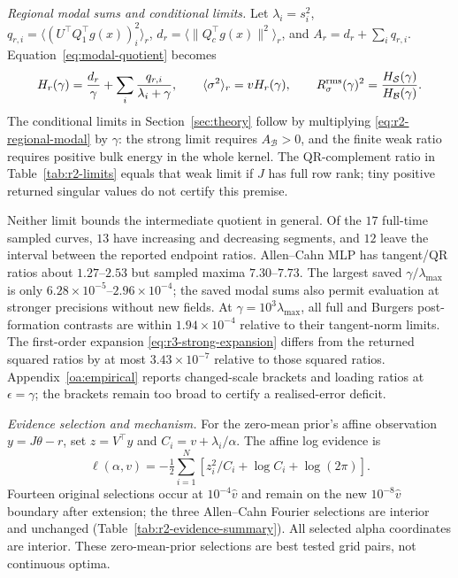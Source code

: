 \emph{Regional modal sums and conditional limits.}\label{app:r2:modal}
Let $\lambda_i=s_i^2$,
$q_{r,i}=\langle(U^\top Q_1^\top g(x))_i^2\rangle_r$,
$d_r=\langle\|Q_c^\top g(x)\|^2\rangle_r$, and
$A_r=d_r+\sum_iq_{r,i}$. Equation~\eqref{eq:modal-quotient} becomes
\begin{equation}\label{eq:r2-regional-modal}
 H_r(\gamma)=\frac{d_r}{\gamma}+\sum_i\frac{q_{r,i}}{\lambda_i+\gamma},\qquad
 \langle\sigma^2\rangle_r=vH_r(\gamma),\qquad
 R_{\sigma}^{\mathrm{rms}}(\gamma)^2=\frac{H_{\mathcal S}(\gamma)}{H_{\mathcal B}(\gamma)}.
\end{equation}
The conditional limits in Section~\ref{sec:theory} follow by multiplying \eqref{eq:r2-regional-modal}
by $\gamma$: the strong limit requires $A_{\mathcal B}>0$, and the finite weak
ratio requires positive bulk energy in the whole kernel. The QR-complement ratio
in Table~\ref{tab:r2-limits} equals that weak limit if $J$ has full row rank;
tiny positive returned singular values do not certify this premise.



Neither limit bounds the intermediate quotient in general. Of the $17$ full-time
sampled curves, $13$ have increasing and decreasing segments, and $12$ leave the
interval between the reported endpoint ratios. Allen--Cahn MLP has tangent/QR ratios
about $1.27$--$2.53$ but sampled maxima $7.30$--$7.73$. The largest saved
$\gamma/\lambda_{\max}$ is only $6.28\times10^{-5}$--$2.96\times10^{-4}$; the
saved modal sums also permit evaluation at stronger precisions without new fields.
At $\gamma=10^3\lambda_{\max}$, all full and Burgers post-formation contrasts are
within $1.94\times10^{-4}$ relative to their tangent-norm limits. The first-order
expansion \eqref{eq:r3-strong-expansion} differs from the returned squared ratios by
at most $3.43\times10^{-7}$ relative to those squared ratios.
Appendix~\ref{oa:empirical} reports changed-scale brackets and loading
ratios at $\epsilon=\gamma$; the brackets remain too broad to certify a realised-error deficit.

\emph{Evidence selection and mechanism.}\label{app:r2:evidence}
For the zero-mean prior's affine observation $y=J\theta-r$, set $z=V^\top y$ and
$C_i=v+\lambda_i/\alpha$. The affine log evidence \citep{mackay1992interpolation} is
\[
 \ell(\alpha,v)=-\tfrac12\sum_{i=1}^N[z_i^2/C_i+\log C_i+\log(2\pi)].
\]
Fourteen original selections occur at $10^{-4}\widehat v$ and remain on the new
$10^{-8}\widehat v$ boundary after extension; the three Allen--Cahn Fourier selections
are interior and unchanged (Table~\ref{tab:r2-evidence-summary}).
All selected alpha coordinates are interior. These zero-mean-prior selections are
best tested grid pairs, not continuous optima.

